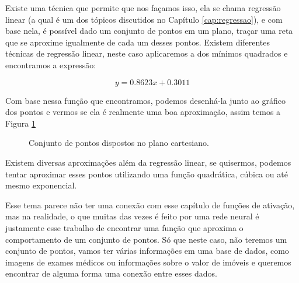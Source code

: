Existe uma técnica que permite que nos façamos isso, ela se chama regressão linear (a qual é um dos tópicos discutidos no Capítulo \ref{cap:regressao}), e com base nela, é possível dado um conjunto de pontos em um plano, traçar uma reta que se aproxime igualmente de cada um desses pontos. Existem diferentes técnicas de regressão linear, neste caso aplicaremos a dos mínimos quadrados e encontramos a expressão:

\[ y=0.8623x+0.3011 \]

Com base nessa função que encontramos, podemos desenhá-la junto ao gráfico dos pontos e vermos se ela é realmente uma boa aproximação, assim temos a Figura \ref{fig: regressao-linear}

\begin{figure}[h!]
    \centering
    \caption{Conjunto de pontos dispostos no plano cartesiano.}
    \label{fig: regressao-linear}
\end{figure}

Existem diversas aproximações além da regressão linear, se quisermos, podemos tentar aproximar esses pontos utilizando uma função quadrática, cúbica ou até mesmo exponencial.

Esse tema parece não ter uma conexão com esse capítulo de funções de ativação, mas na realidade, o que muitas das vezes é feito por uma rede neural é justamente esse trabalho de encontrar uma função que aproxima o comportamento de um conjunto de pontos. Só que neste caso, não teremos um conjunto de pontos, vamos ter várias informações em uma base de dados, como imagens de exames médicos ou informações sobre o valor de imóveis e queremos encontrar de alguma forma uma conexão entre esses dados.

